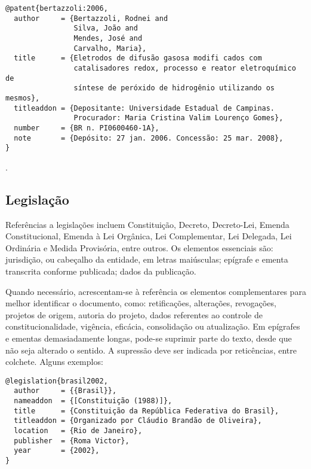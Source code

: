 \vspace*{1em}

\begin{verbatim}
@patent{bertazzoli:2006,
  author     = {Bertazzoli, Rodnei and
                Silva, João and
                Mendes, José and
                Carvalho, Maria},
  title      = {Eletrodos de difusão gasosa modifi cados com
                catalisadores redox, processo e reator eletroquímico de
                síntese de peróxido de hidrogênio utilizando os mesmos},
  titleaddon = {Depositante: Universidade Estadual de Campinas.
                Procurador: Maria Cristina Valim Lourenço Gomes},
  number     = {BR n. PI0600460-1A},
  note       = {Depósito: 27 jan. 2006. Concessão: 25 mar. 2008},
}
\end{verbatim}

\noindent
{}.

\subsection{Legislação}

Referências a legislações incluem Constituição, Decreto, Decreto-Lei, Emenda Constitucional, Emenda à Lei Orgânica, Lei Complementar, Lei Delegada, Lei Ordinária e Medida Provisória, entre outros.
Os elementos essenciais são: jurisdição, ou cabeçalho da entidade, em letras maiúsculas; epígrafe e ementa transcrita conforme publicada; dados da publicação.

Quando necessário, acrescentam-se à referência os elementos complementares para melhor identificar o documento, como: retificações, alterações, revogações, projetos de origem,
autoria do projeto, dados referentes ao controle de constitucionalidade, vigência, eficácia, consolidação ou atualização.
Em epígrafes e ementas demasiadamente longas, pode-se suprimir parte do texto, desde que não seja alterado o sentido. A supressão deve ser indicada por reticências, entre colchete.
Alguns exemplos:

\vspace*{1em}

\begin{verbatim}
@legislation{brasil2002,
  author     = {{Brasil}},
  nameaddon  = {[Constituição (1988)]},
  title      = {Constituição da República Federativa do Brasil},
  titleaddon = {Organizado por Cláudio Brandão de Oliveira},
  location   = {Rio de Janeiro},
  publisher  = {Roma Victor},
  year       = {2002},
}
\end{verbatim}

